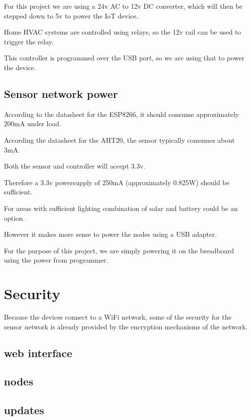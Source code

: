 \documentclass[10pt, journal]{IEEEtran} %
\begin{document}
For this project we are using a 24v AC to 12v DC converter, 
which will then be stepped down to 5v to power the IoT device.

Home HVAC systems are controlled using relays,
so the 12v rail can be used to trigger the relay.

This controller is programmed over the USB port,
so we are using that to power the device.

\subsection{Sensor network power}

According to the datasheet for the ESP8266, it should consume approximately 200mA under load.

According the datasheet for the AHT20, the sensor typically consumes about 3mA.

Both the sensor and controller will accept 3.3v.

Therefore a 3.3v powersupply of 250mA (approximately 0.825W) should be sufficient.

For areas with sufficient lighting combination of solar and battery could be an option.

However it makes more sense to power the nodes using a USB adapter.

For the purpose of this project, 
we are simply powering it on the breadboard using the power from programmer.


\section{Security}

Because the devices connect to a WiFi network,
some of the security for the sensor network is already provided by 
the encryption mechanisms of the network.


\subsection{web interface}

\subsection{nodes}

\subsection{updates}
\end{document}
